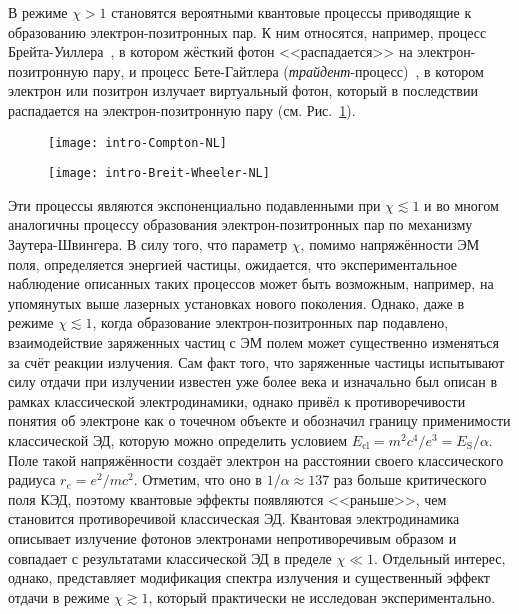 В режиме $\chi > 1$ становятся вероятными квантовые процессы приводящие к образованию электрон-позитронных пар.
К ним относятся, например, процесс Брейта-Уиллера~\cite{breit1934collision}, в котором жёсткий фотон <<распадается>> на электрон-позитронную пару, и процесс Бете-Гайтлера (\textit{трайдент}-процесс)~\cite{bethe1934stopping}, в котором электрон или позитрон излучает виртуальный фотон, который в последствии распадается на электрон-позитронную пару (см. Рис.~\ref{fig:intro/QED}). 
\begin{figure}[ht]
  \begin{minipage}[b][][b]{0.49\linewidth}\centering
      \texttt{[image: intro-Compton-NL]} 
  \end{minipage}
  \hfill
  \begin{minipage}[b][][b]{0.49\linewidth}\centering
      \texttt{[image: intro-Breit-Wheeler-NL]}
  \end{minipage}
  \caption{}
  \label{fig:intro/QED}
\end{figure}
Эти процессы являются экспоненциально подавленными при $\chi \lesssim 1$ и во многом аналогичны процессу образования электрон-позитронных пар по механизму Заутера-Швингера.
В силу того, что параметр $\chi$, помимо напряжённости ЭМ поля, определяется энергией частицы, ожидается, что экспериментальное наблюдение описанных таких процессов может быть возможным, например, на упомянутых выше лазерных установках нового поколения.
Однако, даже в режиме $\chi \lesssim 1$, когда образование электрон-позитронных пар подавлено, взаимодействие заряженных частиц с ЭМ полем может существенно изменяться за счёт реакции излучения.
Сам факт того, что заряженные частицы испытывают силу отдачи при излучении известен уже более века и изначально был описан в рамках классической электродинамики, однако привёл к противоречивости понятия об электроне как о точечном объекте и обозначил границу применимости классической ЭД, которую можно определить условием ${E_\mathrm{cl} = m^2 c^4 / e^3 = E_\mathrm{S} / \alpha}$.
Поле такой напряжённости создаёт электрон на расстоянии своего классического радиуса $r_e = e^2 / m c^2$.
Отметим, что оно в ${1/\alpha \approx 137}$ раз больше критического поля КЭД, поэтому квантовые эффекты появляются <<раньше>>, чем становится противоречивой классическая ЭД. 
Квантовая электродинамика описывает излучение фотонов электронами непротиворечивым образом и совпадает с результатами классической ЭД в пределе ${\chi\ll1}$.
Отдельный интерес, однако, представляет модификация спектра излучения и существенный эффект отдачи в режиме $\chi \gtrsim 1$, который практически не исследован экспериментально.
